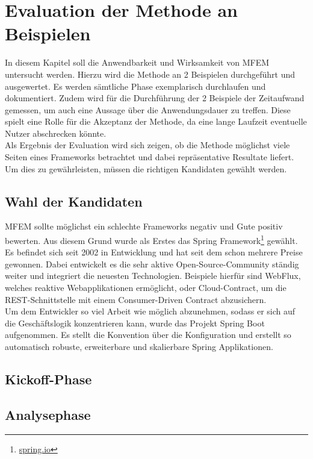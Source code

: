 \section{Evaluation der Methode an Beispielen}

In diesem Kapitel soll die Anwendbarkeit und Wirksamkeit von \ac{MFEM} untersucht werden. Hierzu wird die Methode an 2 Beispielen durchgeführt und ausgewertet. Es werden sämtliche Phase exemplarisch durchlaufen und dokumentiert. Zudem wird für die Durchführung der 2 Beispiele der Zeitaufwand gemessen, um auch eine Aussage über die Anwendungsdauer zu treffen. Diese spielt eine Rolle für die Akzeptanz der Methode, da eine lange Laufzeit eventuelle Nutzer abschrecken könnte.\\ 
Als Ergebnis der Evaluation wird sich zeigen, ob die Methode möglichst viele Seiten eines Frameworks betrachtet und dabei repräsentative Resultate liefert.  
Um dies zu gewährleisten, müssen die richtigen Kandidaten gewählt werden.

\subsection{Wahl der Kandidaten}

\ac{MFEM} sollte möglichst ein schlechte Frameworks negativ und Gute positiv bewerten. Aus diesem Grund wurde als Erstes das Spring Framework\footnote{\url{spring.io}} gewählt. Es befindet sich seit 2002 in Entwicklung und hat seit dem schon mehrere Preise gewonnen\cite{Gutierrez2016}. Dabei entwickelt es die sehr aktive Open-Source-Community ständig weiter und integriert die neuesten Technologien. Beispiele hierfür sind WebFlux, welches reaktive Webapplikationen ermöglicht, oder Cloud-Contract, um die \ac{REST}-Schnittstelle mit einem Consumer-Driven Contract abzusichern.\\
Um dem Entwickler so viel Arbeit wie möglich abzunehmen, sodass er sich auf die Geschäftslogik konzentrieren kann, wurde das Projekt Spring Boot aufgenommen. Es stellt die Konvention über die Konfiguration und erstellt so automatisch robuste, erweiterbare und skalierbare Spring Applikationen\cite[1]{Gutierrez2016}.

\subsection{Kickoff-Phase}
\subsection{Analysephase}
